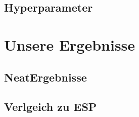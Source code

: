 \documentclass{hbrs-ecta-report}
\begin{document}
\subsection{Hyperparameter}\label{sec:parameter}

\section{Unsere Ergebnisse}
\subsection{NeatErgebnisse}
\subsection{Verlgeich zu ESP}
\end{document}
